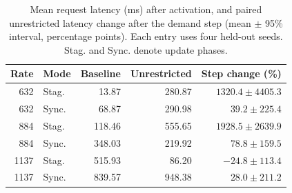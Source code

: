 \begin{table}[t]
\centering\color{blue}\scriptsize
\caption{Mean request latency (ms) after activation, and paired unrestricted latency change after the demand step (mean $\pm$ 95\% interval, percentage points). Each entry uses four held-out seeds. Stag. and Sync. denote update phases.}
\label{tab:emulation}
\setlength{\tabcolsep}{3pt}
\begin{tabular}{rlrrr}
\toprule
Rate & Mode & Baseline & Unrestricted & Step change (\%) \\
\midrule
632 & Stag. & 13.87 & 280.87 & $1320.4\pm4405.3$ \\
632 & Sync. & 68.87 & 290.98 & $39.2\pm225.4$ \\
884 & Stag. & 118.46 & 555.65 & $1928.5\pm2639.9$ \\
884 & Sync. & 348.03 & 219.92 & $78.8\pm159.5$ \\
1137 & Stag. & 515.93 & 86.20 & $-24.8\pm113.4$ \\
1137 & Sync. & 839.57 & 948.38 & $28.0\pm211.2$ \\
\bottomrule
\end{tabular}
\end{table}
